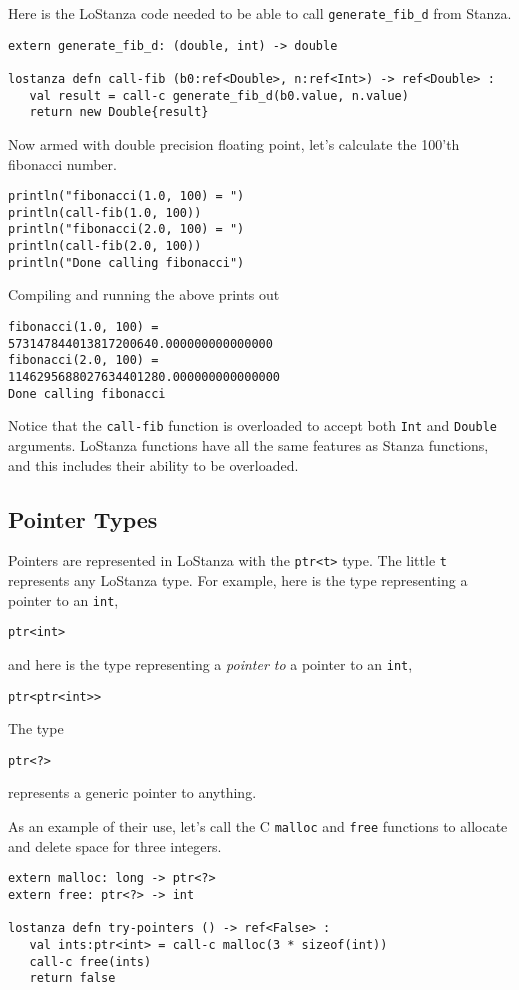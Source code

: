 \documentclass[10pt,oneside]{book}
\begin{document}
Here is the LoStanza code needed to be able to call \texttt{\frenchspacing generate\_fib\_d} from Stanza.
\begin{lstlisting}
extern generate_fib_d: (double, int) -> double

lostanza defn call-fib (b0:ref<Double>, n:ref<Int>) -> ref<Double> :
   val result = call-c generate_fib_d(b0.value, n.value)
   return new Double{result}
\end{lstlisting}

Now armed with double precision floating point, let's calculate the 100'th fibonacci number.
\begin{lstlisting}
println("fibonacci(1.0, 100) = ")
println(call-fib(1.0, 100))
println("fibonacci(2.0, 100) = ")
println(call-fib(2.0, 100))
println("Done calling fibonacci")
\end{lstlisting}
Compiling and running the above prints out
\begin{lstlisting}
fibonacci(1.0, 100) = 
573147844013817200640.000000000000000
fibonacci(2.0, 100) = 
1146295688027634401280.000000000000000
Done calling fibonacci
\end{lstlisting}

Notice that the \texttt{\frenchspacing call-fib} function is overloaded to accept both \texttt{\frenchspacing Int} and \texttt{\frenchspacing Double} arguments. LoStanza functions have all the same features as Stanza functions, and this includes their ability to be overloaded.

\subsection*{Pointer Types}
Pointers are represented in LoStanza with the \texttt{\frenchspacing ptr<t>} type. The little \texttt{\frenchspacing t} represents any LoStanza type. For example, here is the type representing a pointer to an \texttt{\frenchspacing int},
\begin{lstlisting}
ptr<int>
\end{lstlisting}
and here is the type representing a {\em pointer to} a pointer to an \texttt{\frenchspacing int},
\begin{lstlisting}
ptr<ptr<int>>
\end{lstlisting}

The type
\begin{lstlisting}
ptr<?>
\end{lstlisting}
represents a generic pointer to anything.

As an example of their use, let's call the C \texttt{\frenchspacing malloc} and \texttt{\frenchspacing free} functions to allocate and delete space for three integers.
\begin{lstlisting}
extern malloc: long -> ptr<?>
extern free: ptr<?> -> int

lostanza defn try-pointers () -> ref<False> :
   val ints:ptr<int> = call-c malloc(3 * sizeof(int))
   call-c free(ints)
   return false
\end{lstlisting}
\end{document}
